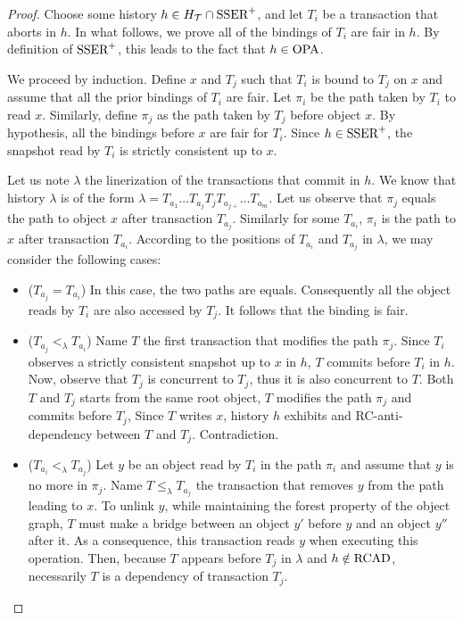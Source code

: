 \begin{proof}
  Choose some history $h \in H_{\mathcal{T}} \inter \SPSER$, and let $T_i$ be a transaction that aborts in $h$.
  In what follows, we prove all of the bindings of $T_i$ are fair in $h$.
  By definition of $\SPSER$, this leads to the fact that $h \in \OPA$.

  We proceed by induction.
  Define $x$ and $T_j$ such that $T_i$ is bound to $T_j$ on $x$ and assume that all the prior bindings of $T_i$ are fair.
  Let $\pi_i$ be the path taken by $T_i$ to read $x$.
  Similarly, define $\pi_j$ as the path taken by $T_j$ before object $x$.
  By hypothesis, all the bindings before $x$ are fair for $T_i$.
  Since $h \in \SPSER$, the snapshot read by $T_i$ is strictly consistent up to $x$.

  Let us note $\lambda$ the linerization of the transactions that commit in $h$.
  We know that history $\lambda$ is of the form $\lambda=T_{a_1} \ldots T_{a_j} T_j T_{a_{j+}} \ldots T_{a_m}$.
  Let us observe that $\pi_j$ equals the path to object $x$ after transaction $T_{a_j}$.
  Similarly for some $T_{a_i}$, $\pi_i$ is the path to $x$ after transaction $T_{a_i}$.  
  According to the positions of $T_{a_i}$ and $T_{a_j}$ in $\lambda$, we may consider the following cases:
  \begin{itemize}
  \item ($T_{a_j} = T_{a_i}$)
    In this case, the two paths are equals.
    Consequently all the object reads by $T_i$ are also accessed by $T_j$.
    It follows that the binding is fair.    
  \item ($T_{a_j} <_{\lambda} T_{a_i}$)
    Name $T$ the first transaction that modifies the path $\pi_j$.
    Since $T_i$ observes a strictly consistent snapshot up to $x$ in $h$, $T$ commits before $T_i$ in $h$.
    Now, observe that $T_j$ is concurrent to $T_j$, thus it is also concurrent to $T$.
    Both $T$ and $T_j$ starts from the same root object, $T$ modifies the path $\pi_j$ and commits before $T_j$,
    Since $T$ writes $x$, history $h$ exhibits and RC-anti-dependency between $T$ and $T_j$.
    Contradiction.
  \item ($T_{a_i} <_{\lambda} T_{a_j}$)
    Let $y$ be an object read by $T_i$ in the path $\pi_i$ and assume that $y$ is no more in $\pi_j$.
    Name $T \leq_{\lambda} T_{a_j}$ the transaction that removes $y$ from the path leading to $x$.
    To unlink $y$, while maintaining the forest property of the object graph, $T$ must make a bridge between an object $y'$ before $y$ and an object $y''$ after it.
    As a consequence, this transaction reads $y$ when executing this operation.
    Then, because $T$ appears before $T_j$ in $\lambda$ and $h \notin \RCAD$, necessarily $T$ is a dependency of transaction $T_j$.
  \end{itemize}
\end{proof}
